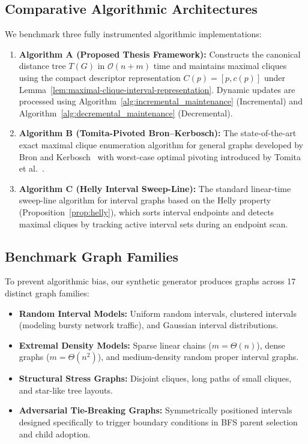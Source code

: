 \subsection{Comparative Algorithmic Architectures}
We benchmark three fully instrumented algorithmic implementations:
\begin{enumerate}
    \item \textbf{Algorithm A (Proposed Thesis Framework):} Constructs the canonical distance tree $T(G)$ in $\mathcal{O}(n + m)$ time and maintains maximal cliques using the compact descriptor representation $C(p) = [p, c(p)]$ under Lemma~\ref{lem:maximal-clique-interval-representation}. Dynamic updates are processed using Algorithm~\ref{alg:incremental_maintenance} (Incremental) and Algorithm~\ref{alg:decremental_maintenance} (Decremental).
    \item \textbf{Algorithm B (Tomita-Pivoted Bron--Kerbosch):} The state-of-the-art exact maximal clique enumeration algorithm for general graphs developed by Bron and Kerbosch~\cite{bron1973algorithm} with worst-case optimal pivoting introduced by Tomita et al.~\cite{tomita2006worst}.
    \item \textbf{Algorithm C (Helly Interval Sweep-Line):} The standard linear-time sweep-line algorithm for interval graphs based on the Helly property (Proposition~\ref{prop:helly}), which sorts interval endpoints and detects maximal cliques by tracking active interval sets during an endpoint scan.
\end{enumerate}

\subsection{Benchmark Graph Families}
To prevent algorithmic bias, our synthetic generator produces graphs across 17 distinct graph families:
\begin{itemize}
    \item \textbf{Random Interval Models:} Uniform random intervals, clustered intervals (modeling bursty network traffic), and Gaussian interval distributions.
    \item \textbf{Extremal Density Models:} Sparse linear chains ($m = \Theta(n)$), dense graphs ($m = \Theta(n^2)$), and medium-density random proper interval graphs.
    \item \textbf{Structural Stress Graphs:} Disjoint cliques, long paths of small cliques, and star-like tree layouts.
    \item \textbf{Adversarial Tie-Breaking Graphs:} Symmetrically positioned intervals designed specifically to trigger boundary conditions in BFS parent selection and child adoption.
\end{itemize}

